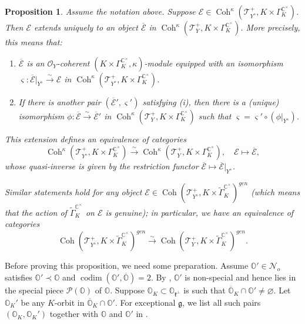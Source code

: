 \documentclass[11pt, a4paper]{amsart}
\newcommand{\C}{\mathbb{C}}
\newcommand{\g}{\mathfrak{g}}
\newcommand{\orb}{\mathbb{O}}
\newcommand{\orbk}{\orb_{K}}
\newcommand{\fk}{\mathfrak{k}}
\newcommand{\cN}{\mathcal{N}}
\newcommand{\cP}{\mathcal{P}}
\newcommand{\cE}{\mathcal{E}}
\newcommand{\tGamma}{\widetilde{\Gamma}}
\DeclareMathOperator{\codim}{codim}
\DeclareMathOperator{\Coh}{Coh}
\newcommand{\TT}{\mathscr{T}}
\newcommand{\cm}{\C^\times}
\newcommand{\OO}{\mathcal{O}}
\newtheorem{Prop}[Thm]{Proposition}
\theoremstyle{definition}
\numberwithin{equation}{section}
\begin{document}
\begin{Prop}\label{prop:extn_AOD}
	Assume the notation above. Suppose $\cE \in \Coh^\kappa(\TT^+_{Y^\diamond}, K \times \Gamma_K^{\cm})$. Then $\cE$ extends uniquely to an object $\overline{\cE}$ in $\Coh^\kappa(\TT^+_Y, K \times \Gamma_K^{\cm})$. More precisely, this means that: 
	\begin{enumerate}[label=(\roman*), leftmargin=*, itemindent=*]
		\item $\overline{\cE}$ is an $\OO_Y$-coherent $(K \times \Gamma_K^{\cm}, \kappa)$-module equipped with an isomorphism $\varsigma: \overline{\cE}|_{Y^\diamond} \xrightarrow{\sim} \cE$ in $\Coh^\kappa(\TT^+_{Y^\diamond}, K \times \Gamma_K^{\cm})$.
		
		\item If there is another pair $(\overline{\cE}', \varsigma')$ satisfying (i), then there is a (unique) isomorphism $\phi: \overline{\cE} \xrightarrow{\sim} \overline{\cE}'$ in $\Coh^\kappa(\TT^+_Y, K \times \Gamma_K^{\cm})$ such that $\varsigma = \varsigma' \circ (\phi|_{Y^\diamond})$. 
	\end{enumerate}
	This extension defines an equivalence of categories
    	\[ \Coh^\kappa(\TT^+_{Y^\diamond}, K \times \Gamma_K^{\cm}) \xrightarrow{\sim} \Coh^\kappa(\TT^+_Y, K \times \Gamma_K^{\cm}), \quad \cE \mapsto \overline{\cE}, \]
    whose quasi-inverse is given by the restriction functor $\overline{\cE} \mapsto \overline{\cE}|_{Y^\diamond}$.

    Similar statements hold for any object $\cE \in \Coh(\TT^+_{Y^\diamond}, K \times \tGamma_K^{\cm})^{gen}$ (which means that the action of $\tGamma_K^{\cm}$ on $\cE$ is genuine); in particular, we have an equivalence of categories
    \[ \Coh(\TT^+_{Y^\diamond}, K \times \tGamma_K^{\cm})^{gen} \xrightarrow{\sim} \Coh(\TT^+_Y, K \times \tGamma_K^{\cm})^{gen}. \]
	

\end{Prop}

Before proving this proposition, we need some preparation. 
Assume $\orb' \in \cN_o$ satisfies $\orb' \prec \orb$ and $\codim(\orb', \overline{\orb}) = 2$. By , $\orb'$ is non-special and hence lies in the special piece $\cP(\orb)$ of $\orb$. Suppose $\orbk \subset \orb_{\fk^\perp}$ is such that $\overline{\orb}_K \cap \orb' \neq \varnothing$. Let $\orbk'$ be any $K$-orbit in $\overline{\orb}_K \cap \orb'$. For exceptional $\g$, we list all such pairs $(\orbk, \orbk')$ together with $\orb$ and $\orb'$ in .
\end{document}
